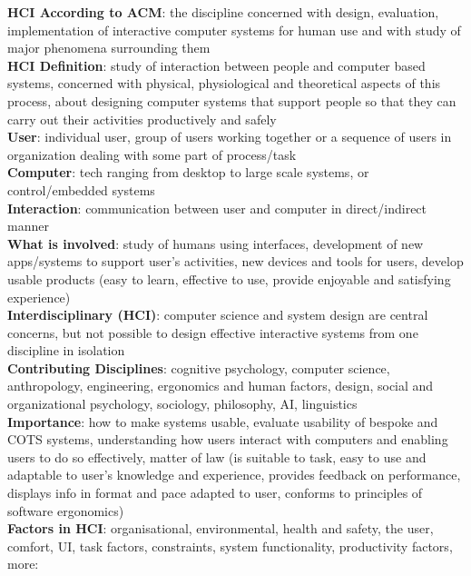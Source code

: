 \documentclass[a4paper]{article}
\begin{document}
    \scriptsize
    \begin{multicols}{2}
        \noindent\textbf{HCI According to ACM}: the discipline concerned with design, evaluation, implementation of interactive computer systems for human use and with study of major phenomena surrounding them\\
        \textbf{HCI Definition}: study of interaction between people and computer based systems, concerned with physical, physiological and theoretical aspects of this process, about designing computer systems that support people so that they can carry out their activities productively and safely\\
        \textbf{User}: individual user, group of users working together or a sequence of users in organization dealing with some part of process/task\\
        \textbf{Computer}: tech ranging from desktop to large scale systems, or control/embedded systems\\
        \textbf{Interaction}: communication between user and computer in direct/indirect manner\\
        \textbf{What is involved}: study of humans using interfaces, development of new apps/systems to support user's activities, new devices and tools for users, develop usable products (easy to learn, effective to use, provide enjoyable and satisfying experience)\\
        \textbf{Interdisciplinary (HCI)}: computer science and system design are central concerns, but not possible to design effective interactive systems from one discipline in isolation\\
        \textbf{Contributing Disciplines}: cognitive psychology, computer science, anthropology, engineering, ergonomics and human factors, design, social and organizational psychology, sociology, philosophy, AI, linguistics\\
        \textbf{Importance}: how to make systems usable, evaluate usability of bespoke and COTS systems, understanding how users interact with computers and enabling users to do so effectively, matter of law (is suitable to task, easy to use and adaptable to user's knowledge and experience, provides feedback on performance, displays info in format and pace adapted to user, conforms to principles of software ergonomics)\\
        \textbf{Factors in HCI}: organisational, environmental, health and safety, the user, comfort, UI, task factors, constraints, system functionality, productivity factors, more:\\

\end{multicols}
\end{document}

